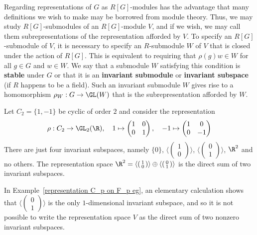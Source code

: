 Regarding representations of $G$ as $R[G]$-modules has the advantage that many definitions we wish to make may be borrowed from module theory. Thus, we may study $R[G]$-submodules of an $R[G]$-module $V$, and if we wish, we may call them subrepresentations of the representation afforded by $V$. To specify an $R[G]$-submodule of $V$, it is necessary to specify an $R$-submodule $W$ of $V$ that is closed under the action of $R[G]$. This is equivalent to requiring that $\rho(g)w\in W$ for all $g\in G$ and $w\in W$. We say that a submodule $W$ satisfying this condition is \textbf{stable} under $G$ or that it is an \textbf{invariant submodule} or \textbf{invariant subspace} (if $R$ happens to be a field). Such an invariant submodule $W$ gives rise to a homomorphism $\rho_W:G\to\GL(W)$ that is the subrepresentation afforded by $W$.
\begin{example}\label{representation of C_2 semisimple}
Let $C_2=\{1,-1\}$ be cyclic of order $2$ and consider the representation
\[\rho:C_2\to\GL_2(\R),\quad 1\mapsto\begin{pmatrix}
1&0\\
0&1
\end{pmatrix},\quad -1\mapsto\begin{pmatrix}
1&0\\
0&-1
\end{pmatrix}\]
There are just four invariant subspaces, namely $\{0\}$, $\langle(\begin{smallmatrix}1\\0\end{smallmatrix})\rangle$, $\langle(\begin{smallmatrix}0\\1\end{smallmatrix})\rangle$, $\R^2$ and no others. The representation space $\R^2=\langle(\begin{smallmatrix}1\\0\end{smallmatrix})\rangle\oplus\langle(\begin{smallmatrix}0\\1\end{smallmatrix})\rangle$ is the direct sum of two invariant subspaces.
\end{example}
\begin{example}\label{representation of C_p on F_p non semisimple}
In Example~\ref{representation C_p on F_p eg}, an elementary calculation shows that $\langle(\begin{smallmatrix}0\\1\end{smallmatrix})\rangle$ is the only $1$-dimensional invariant subspace, and so it is not possible to write the representation space $V$ as the direct sum of two nonzero invariant subspaces.
\end{example}
